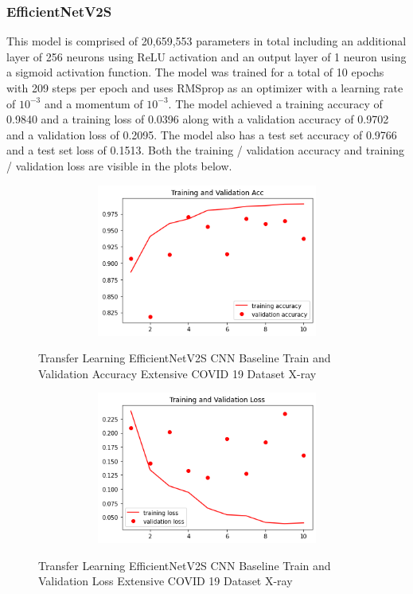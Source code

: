 \subsubsection{EfficientNetV2S}
This model is comprised of 20,659,553 parameters in total including an additional layer of 256 neurons using ReLU activation and an output layer of 1 neuron using a sigmoid activation function.  The model was trained for a total of 10 epochs with 209 steps per epoch and uses RMSprop as an optimizer with a learning rate of $10^{-3}$ and a momentum of $10^{-3}$.  The model achieved a training accuracy of 0.9840 and a training loss of 0.0396 along with a validation accuracy of 0.9702 and a validation loss of 0.2095.  The model also has a test set accuracy of 0.9766 and a test set loss of 0.1513. Both the training / validation accuracy and training / validation loss are visible in the plots below.
 \begin{figure}[H]
    \centering    \includegraphics[width=1\textwidth,height=5cm,keepaspectratio]{Images/EfficientNetV2SBaselineTrainingValidationAccuracyExtensiveCT.png}\\
    \caption{Transfer Learning EfficientNetV2S CNN Baseline Train and Validation Accuracy Extensive COVID 19 Dataset X-ray}
    \label{fig:EfficientNetV2S CNN Baseline Train and Validation Accuracy Extensive COVID 19 Dataset Xray}
\end{figure}
 \begin{figure}[H]
    \centering
    \includegraphics[width=1\textwidth,height=5cm,keepaspectratio]{Images/EfficientNetV2SBaselineTrainingValidationLossExtensiveXray.png}\\
    \caption{Transfer Learning EfficientNetV2S CNN Baseline Train and Validation Loss Extensive COVID 19 Dataset X-ray}
    \label{fig:EfficientNetV2S CNN Baseline Train and Validation Loss Extensive COVID 19 Dataset X-ray}
\end{figure}

